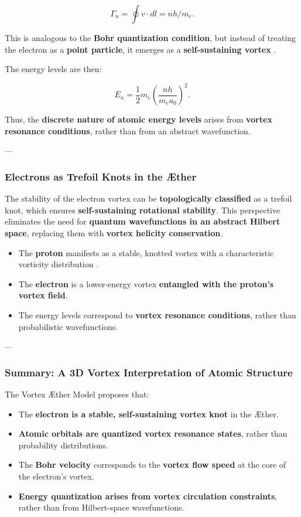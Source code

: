 \begin{equation*}
    \Gamma_n = \oint v \cdot dl = n h / m_e.
\end{equation*}

This is analogous to the \textbf{Bohr quantization condition}, but instead of treating the electron as a \textbf{point particle}, it emerges as a \textbf{self-sustaining vortex} \cite{moffatt_helicity, knotted_vortices}.

The energy levels are then:

\begin{equation*}
    E_n = \frac{1}{2} m_e \left( \frac{n h}{m_e a_0} \right)^2.
\end{equation*}

Thus, the \textbf{discrete nature of atomic energy levels} arises from \textbf{vortex resonance conditions}, rather than from an abstract wavefunction.

---

\subsubsection*{Electrons as Trefoil Knots in the Æther}

The stability of the electron vortex can be \textbf{topologically classified} as a trefoil knot, which ensures \textbf{self-sustaining rotational stability}. This perspective eliminates the need for \textbf{quantum wavefunctions in an abstract Hilbert space}, replacing them with \textbf{vortex helicity conservation}.

\begin{itemize}
    \item The \textbf{proton} manifests as a stable, knotted vortex with a characteristic vorticity distribution \cite{thomson_knots}.
    \item The \textbf{electron} is a lower-energy vortex \textbf{entangled with the proton's vortex field}.
    \item The energy levels correspond to \textbf{vortex resonance conditions}, rather than probabilistic wavefunctions.
\end{itemize}

---

\subsubsection*{Summary: A 3D Vortex Interpretation of Atomic Structure}

The Vortex Æther Model proposes that:
\begin{itemize}
    \item The \textbf{electron is a stable, self-sustaining vortex knot} in the Æther.
    \item \textbf{Atomic orbitals are quantized vortex resonance states}, rather than probability distributions.
    \item The \textbf{Bohr velocity} corresponds to the \textbf{vortex flow speed} at the core of the electron's vortex.
    \item \textbf{Energy quantization arises from vortex circulation constraints}, rather than from Hilbert-space wavefunctions.
\end{itemize}